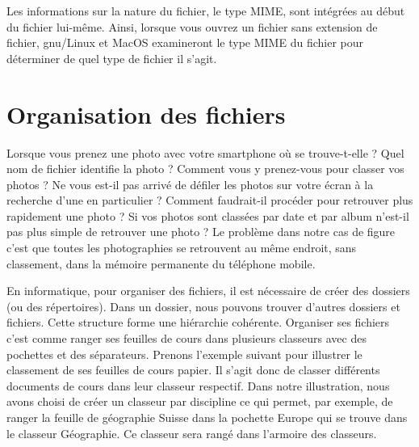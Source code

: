 \documentclass[11pt, a4paper]{book}
\begin{document}
Les informations sur la nature du fichier, le type MIME, sont intégrées au début du fichier lui-même. Ainsi, lorsque vous ouvrez un fichier sans extension de fichier, gnu/Linux et MacOS examineront le type MIME du fichier pour déterminer de quel type de fichier il s’agit.


\section{Organisation des fichiers}

Lorsque vous prenez une photo avec votre smartphone où se trouve-t-elle ? Quel nom de fichier identifie la photo ? Comment vous y prenez-vous pour classer vos photos ? Ne vous est-il pas arrivé de défiler les photos sur votre écran à la recherche d’une en particulier ? Comment faudrait-il procéder pour retrouver plus rapidement une photo ? Si vos photos sont classées par date et par album n’est-il pas plus simple de retrouver une photo ? Le problème dans notre cas de figure c'est que toutes les photographies se retrouvent au même endroit, sans classement, dans la mémoire permanente du téléphone mobile.

En informatique, pour organiser des fichiers, il est nécessaire de créer des dossiers (ou des répertoires). Dans un dossier, nous pouvons trouver d’autres dossiers et fichiers. Cette structure forme une hiérarchie cohérente. Organiser ses fichiers c’est comme ranger ses feuilles de cours dans plusieurs classeurs avec des pochettes et des séparateurs. Prenons l’exemple suivant pour illustrer le classement de ses feuilles de cours papier. Il s’agit donc de classer différents documents de cours dans leur classeur respectif. Dans notre illustration, nous avons choisi de créer un classeur par discipline ce qui permet, par exemple, de ranger la feuille de géographie Suisse dans la pochette Europe qui se trouve dans le classeur Géographie. Ce classeur sera rangé dans l’armoire des classeurs.
\end{document}
